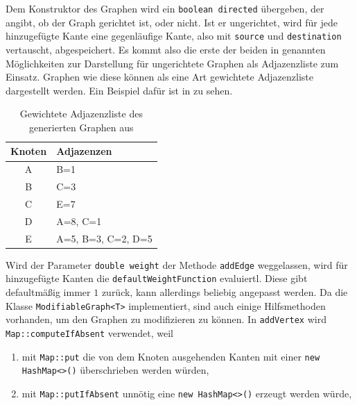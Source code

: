             Dem Konstruktor des Graphen wird ein \lstinline{boolean directed} übergeben, der angibt, ob der Graph gerichtet ist, oder nicht. Ist er ungerichtet, wird für jede hinzugefügte Kante eine gegenläufige Kante, also mit \lstinline{source} und \lstinline{destination} vertauscht, abgespeichert. Es kommt also die erste der beiden in  genannten Möglichkeiten zur Darstellung für ungerichtete Graphen als Adjazenzliste zum Einsatz. Graphen wie diese können als eine Art gewichtete Adjazenzliste dargestellt werden. Ein Beispiel dafür ist in  zu sehen.

            \begin{table}
                \centering
                \begin{tabular}{c|l}
                    Knoten & Adjazenzen\\ \hline
                    A & B=1\\
                    B & C=3\\
                    C & E=7\\
                    D & A=8, C=1\\
                    E & A=5, B=3, C=2, D=5
                \end{tabular}
                \caption{Gewichtete Adjazenzliste des generierten Graphen aus }
                \label{tab:example-adjacency-list}
            \end{table}
            
            Wird der Parameter \lstinline{double weight} der Methode \lstinline{addEdge} weggelassen, wird für hinzugefügte Kanten die \lstinline{defaultWeightFunction} evaluiertl. Diese gibt defaultmäßig immer $1$ zurück, kann allerdings beliebig angepasst werden. Da die Klasse \lstinline{ModifiableGraph<T>} implementiert, sind auch einige Hilfsmethoden vorhanden, um den Graphen zu modifizieren zu können. In \lstinline{addVertex} wird \lstinline{Map::computeIfAbsent} verwendet, weil
            
            \begin{enumerate}
                \item mit \lstinline{Map::put} die von dem Knoten ausgehenden Kanten mit einer \lstinline{new HashMap<>()} überschrieben werden würden,
            
                \item mit \lstinline{Map::putIfAbsent} unnötig eine \lstinline{new HashMap<>()} erzeugt werden würde,
            \end{enumerate}


